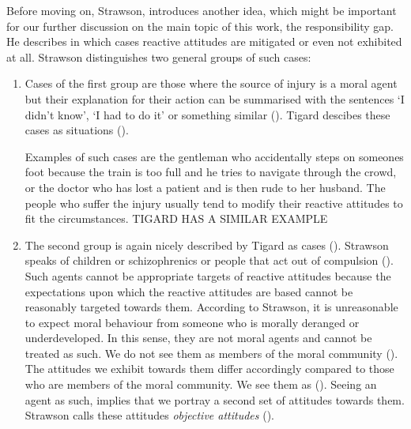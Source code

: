 \documentclass{article}
\begin{document}
Before moving on, Strawson, introduces another idea, which might be important for
our further discussion on the main topic of this work, the responsibility gap.
He describes in which cases reactive attitudes are mitigated or even not
exhibited at all. Strawson distinguishes two general groups of such cases:

\begin{enumerate}
	\item Cases of the first group are those where the source of injury is a
		moral agent but their explanation for their action can be
		summarised with the sentences `I didn't know', `I had to do it'
		or something similar (\cite[p.7-8]{Strawson1962}). Tigard
		descibes these cases as situations  
		(\cite[p.5]{Tigard_2020}).

		Examples of such cases are the gentleman who accidentally steps
		on someones foot because the train is too full and he tries to
		navigate through the crowd, or the doctor who has lost a patient
		and is then rude to her husband. The people who suffer the
		injury usually tend to modify their reactive attitudes to fit
		the circumstances.
		TIGARD HAS A SIMILAR EXAMPLE



	\item The second group is again nicely described by Tigard as cases
		 (\cite[p.5]{Tigard_2020}). Strawson speaks of children
		or schizophrenics or people that act out of compulsion
		(\cite[p.8-9]{Strawson1962}). Such
		agents cannot be appropriate targets of reactive attitudes
		because the expectations upon which the reactive attitudes are
		based cannot be reasonably targeted towards them. According to
		Strawson, it is unreasonable to expect moral behaviour from
		someone who is morally deranged or underdeveloped. In this
		sense, they are not moral agents and cannot be treated as such.
		We do not see them as members of the moral community
		(\cite[p.18]{Strawson1962}). The attitudes we exhibit towards
		them differ accordingly compared to those who are members of the
		moral community. We see them as 
		(\cite[p.8]{Strawson1962}). Seeing an agent as such, implies
		that we portray a second set of attitudes towards them. Strawson
		calls these attitudes \textit{objective attitudes}
		(\cite[p.9]{Strawson1962}). 
\end{enumerate}
\end{document}
